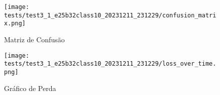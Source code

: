 \begin{figure}[ht]
 \begin{center}
   \texttt{[image: tests/test3\_1\_e25b32class10\_20231211\_231229/confusion\_matrix.png]}
  \caption{Matriz de Confusão}
  \label{fig:fig03}
 \end{center}
\end{figure}

\begin{figure}[ht]
 \begin{center}
   \texttt{[image: tests/test3\_1\_e25b32class10\_20231211\_231229/loss\_over\_time.png]}
  \caption{Gráfico de Perda}
  \label{fig:fig04}
 \end{center}
\end{figure}
